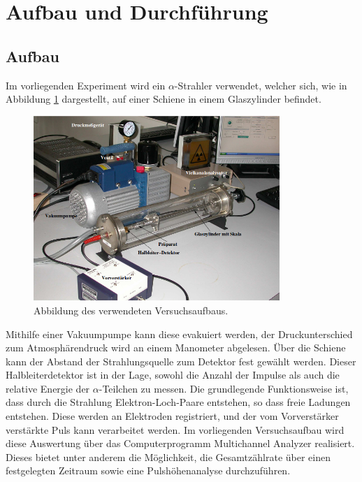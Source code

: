 \section{Aufbau und Durchführung}
\subsection{Aufbau}
\label{sec:Aufbau}
Im vorliegenden Experiment wird ein $\alpha$-Strahler verwendet, welcher sich, wie in Abbildung \ref{abb:1} dargestellt, auf einer Schiene in einem Glaszylinder befindet.
\begin{figure}
  \centering
  \includegraphics[height=7cm]{ressources/aufbau.png}
  \caption{Abbildung des verwendeten Versuchsaufbaus. \cite{skript}}
  \label{abb:1}
\end{figure}
Mithilfe einer Vakuumpumpe kann diese evakuiert werden, der Druckunterschied zum Atmosphärendruck wird an einem Manometer abgelesen.
Über die Schiene kann der Abstand der Strahlungsquelle zum Detektor fest gewählt werden.
Dieser Halbleiterdetektor ist in der Lage, sowohl die Anzahl der Impulse als auch die relative Energie der $\alpha$-Teilchen zu messen.
Die grundlegende Funktionsweise ist, dass durch die Strahlung Elektron-Loch-Paare entstehen, so dass freie Ladungen entstehen.
Diese werden an Elektroden registriert, und der vom Vorverstärker verstärkte Puls kann verarbeitet werden.
Im vorliegenden Versuchsaufbau wird diese Auswertung über das Computerprogramm Multichannel Analyzer realisiert.
Dieses bietet unter anderem die Möglichkeit, die Gesamtzählrate über einen festgelegten Zeitraum sowie eine Pulshöhenanalyse durchzuführen.
